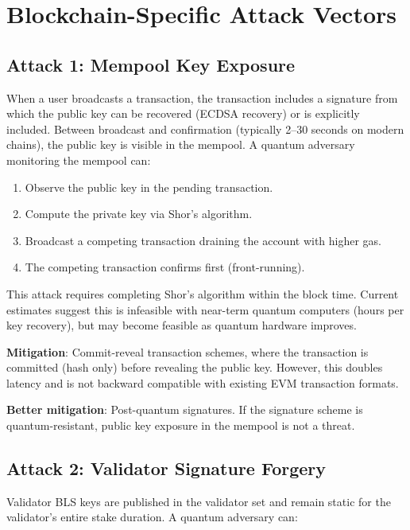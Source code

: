 \section{Blockchain-Specific Attack Vectors}

\label{sec:attack-vectors}

\subsection{Attack 1: Mempool Key Exposure}

When a user broadcasts a transaction, the transaction includes a signature from which
the public key can be recovered (ECDSA recovery) or is explicitly included. Between
broadcast and confirmation (typically 2--30 seconds on modern chains), the public key
is visible in the mempool. A quantum adversary monitoring the mempool can:

\begin{enumerate}[leftmargin=2em]
  \item Observe the public key in the pending transaction.
  \item Compute the private key via Shor's algorithm.
  \item Broadcast a competing transaction draining the account with higher gas.
  \item The competing transaction confirms first (front-running).
\end{enumerate}

This attack requires completing Shor's algorithm within the block time. Current
estimates suggest this is infeasible with near-term quantum computers (hours per key
recovery), but may become feasible as quantum hardware improves.

\textbf{Mitigation}: Commit-reveal transaction schemes, where the transaction is
committed (hash only) before revealing the public key. However, this doubles latency
and is not backward compatible with existing EVM transaction formats.

\textbf{Better mitigation}: Post-quantum signatures. If the signature scheme is
quantum-resistant, public key exposure in the mempool is not a threat.

\subsection{Attack 2: Validator Signature Forgery}

Validator BLS keys are published in the validator set and remain static for the
validator's entire stake duration. A quantum adversary can:


